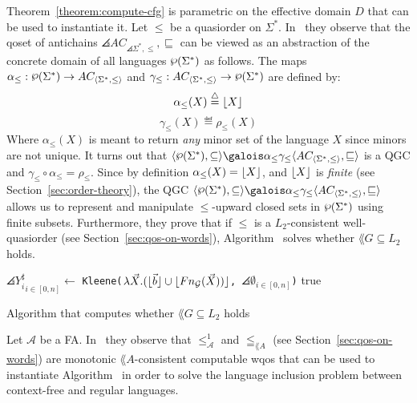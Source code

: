 Theorem~\ref{theorem:compute-cfg} is parametric on the effective
domain $D$ that can be used to instantiate it.
Let $\leq$ be a quasiorder on $\Sigma^*$.
In~\cite{ganty2019language} they observe that the qoset of
antichains $\angles{AC_{\angles{\Sigma^*,\leq}}, \sqsubseteq}$ can be viewed as an abstraction
of the concrete domain of all languages $\powerset(\Sigma^*)$ as follows.
The maps $\alpha_{\leq}: \powersetSigmas \rightarrow \acSigmas$ and
$\gamma_{\leq}: \acSigmas \rightarrow \powersetSigmas$ are defined by:
\[ \alpha_{\leq}(X) \overset{\triangle}{=} \lfloor X \rfloor \]
\[ \gamma_{\leq}(X) \eqdef \rho_{\leq}(X) \]
Where $\alpha_{\leq}(X)$ is meant to return \emph{any} minor set of the language $X$
since minors are not unique.
It turns out that $\pgc{\powersetSigmas}{\subseteq}{\acSigmas}{\sqsubseteq}{\alpha_{\leq}}{\gamma_{\leq}}$
is a QGC and $\gamma_{\leq} \circ \alpha_{\leq} = \rho_{\leq}$.
Since by definition $\alpha_{\leq}(X) = \lfloor X \rfloor$, and $\lfloor X \rfloor$ is
\emph{finite} (see Section~\ref{sec:order-theory}), the QGC $\pgc{\powersetSigmas}{\subseteq}{\acSigmas}{\sqsubseteq}{\alpha_{\leq}}{\gamma_{\leq}}$
allows us to represent and manipulate $\leq$-upward closed sets in $\powersetSigmas$
using finite subsets.
Furthermore, they prove that if $\leq$ is a $L_2$-consistent well-quasiorder
(see Section~\ref{sec:qos-on-words}),
Algorithm~ solves whether $\lang{G} \subseteq L_2$ holds.

\begin{algorithm}[h]
\label{alg:grammar}

\SetAlgoLined
\LinesNumbered
{}

$\angles{Y_i^{\sharp}}_{i \in [0,n]} \leftarrow$ \texttt{Kleene($\lambda \vec{X}. (\lfloor \vec{b} \rfloor \cup \lfloor Fn_{\mathcal{G}}(\vec{X})) \rfloor$, $\angles{\emptyset}_{i \in [0,n]}$)} \;
\Return true
\caption{Algorithm that computes whether $\lang{G} \subseteq L_2$ holds}
\end{algorithm}

Let $\mathcal{A}$ be a FA.
In~\cite{ganty2019language} they observe that $\leq^1_{\mathcal{A}}$ and $\leqq_{\lang{A}}$
(see Section~\ref{sec:qos-on-words}) are monotonic $\lang{A}$-consistent
computable wqos that can be used to instantiate Algorithm~
in order to solve the language inclusion problem between context-free and
regular languages.

